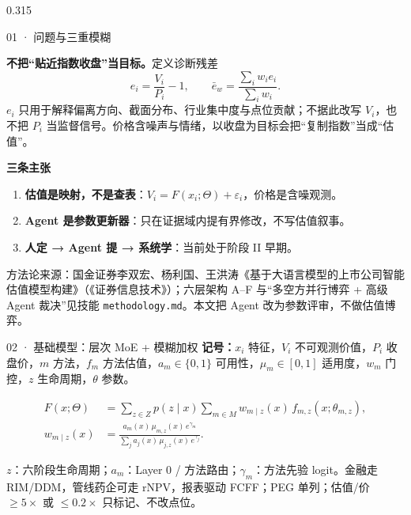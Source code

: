 \documentclass[final]{beamer}
\newcommand{\kw}[1]{\textcolor{csred}{\textbf{#1}}}
\newcommand{\muted}[1]{\textcolor{dim}{#1}}
\begin{document}
\begin{frame}[t]
\begin{columns}[t,onlytextwidth]
\begin{column}{0.315\textwidth}
\begin{block}{01 ·  问题与三重模糊}
\vspace{3mm}
\colorbox{softred}{\parbox{\dimexpr\linewidth-2\fboxsep}{%
\kw{不把“贴近指数收盘”当目标。}定义诊断残差
{\fontsize{24}{30}\selectfont
\[
e_i=\frac{V_i}{P_i}-1,\qquad \bar e_w=\frac{\sum_i w_i e_i}{\sum_i w_i}.
\]
}
\(e_i\) 只用于解释偏离方向、截面分布、行业集中度与点位贡献；不据此改写 \(V_i\)，也不把 \(P_i\) 当监督信号。价格含噪声与情绪，以收盘为目标会把“复制指数”当成“估值”。}}

\vspace{3mm}
{\bfseries 三条主张}\\[1mm]
\begin{enumerate}
\item \kw{估值是映射，不是查表}：\(V_i=F(x_i;\Theta)+\varepsilon_i\)，价格是含噪观测。
\item \kw{Agent 是参数更新器}：只在证据域内提有界修改，不写估值叙事。
\item \kw{人定 → Agent 提 → 系统学}：当前处于阶段 II 早期。
\end{enumerate}

\vspace{2mm}
\muted{\footnotesize 方法论来源：国金证券李双宏、杨利国、王洪涛《基于大语言模型的上市公司智能估值模型构建》（《证券信息技术》）；六层架构 A–F 与“多空方并行博弈 + 高级 Agent 裁决”见技能 \texttt{methodology.md}。本文把 Agent 改为参数评审，不做估值博弈。}
\end{block}

\begin{block}{02 ·  基础模型：层次 MoE + 模糊加权}
{\bfseries 记号：}\(x_i\) 特征，\(V_i\) 不可观测价值，\(P_i\) 收盘价，\(m\) 方法，\(f_m\) 方法估值，\(a_m\in\{0,1\}\) 可用性，\(\mu_m\in[0,1]\) 适用度，\(w_m\) 门控，\(z\) 生命周期，\(\theta\) 参数。

\vspace{2mm}
{\fontsize{24}{30}\selectfont
\begin{align}
F(x;\Theta)&=\sum_{z\in Z}p(z\mid x)\sum_{m\in M}w_{m\mid z}(x)\,f_{m,z}(x;\theta_{m,z}),\tag{1}\\
w_{m\mid z}(x)&=\frac{a_m(x)\,\mu_{m,z}(x)\,e^{\gamma_m}}{\sum_{j}a_j(x)\,\mu_{j,z}(x)\,e^{\gamma_j}}.\tag{2}
\end{align}
}

\muted{\(z\)：六阶段生命周期；\(a_m\)：Layer 0 / 方法路由；\(\gamma_m\)：方法先验 logit。金融走 RIM/DDM，管线药企可走 rNPV，报表驱动 FCFF；PEG 单列；估值/价 \(\ge5\times\) 或 \(\le0.2\times\) 只标记、不改点位。}


\end{block}
\end{column}
\end{columns}
\end{frame}
\end{document}
